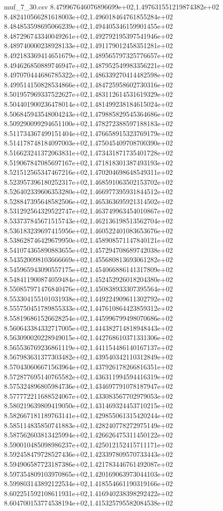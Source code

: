 \begin{filecontents*}{muf_7_30.csv}
8.479967646076896699e+02,1.497631551219874382e+02
8.482410566281618003e+02,1.496018464761855284e+02
8.484853598695066239e+02,1.494405346159901455e+02
8.487296743340049261e+02,1.492792195397541946e+02
8.489740000238928133e+02,1.491179012458351281e+02
8.492183369414651679e+02,1.489565797325776657e+02
8.494626850889746947e+02,1.487952549983356221e+02
8.497070444686785322e+02,1.486339270414482598e+02
8.499514150828534866e+02,1.484725958602730316e+02
8.501957969337522627e+02,1.483112614531619329e+02
8.504401900236478014e+02,1.481499238184615024e+02
8.506845943548004243e+02,1.479885829545364686e+02
8.509290099294651100e+02,1.478272388597188183e+02
8.511734367499151404e+02,1.476658915323769179e+02
8.514178748184097003e+02,1.475045409708700390e+02
8.516623241372063831e+02,1.473431871735401728e+02
8.519067847085697167e+02,1.471818301387493193e+02
8.521512565347467216e+02,1.470204698648549311e+02
8.523957396180252317e+02,1.468591063502153702e+02
8.526402339606353280e+02,1.466977395931844512e+02
8.528847395648582506e+02,1.465363695921314502e+02
8.531292564329522747e+02,1.463749963454010867e+02
8.533737845671515743e+02,1.462136198513562704e+02
8.536183239697415956e+02,1.460522401083653676e+02
8.538628746429679950e+02,1.458908571147840121e+02
8.541074365890883655e+02,1.457294708689742038e+02
8.543520098103666669e+02,1.455680813693061282e+02
8.545965943090557175e+02,1.454066886141317809e+02
8.548411900874059484e+02,1.452452926018204380e+02
8.550857971476840476e+02,1.450838933307395564e+02
8.553304155101031938e+02,1.449224909611302792e+02
8.555750451789855333e+02,1.447610864423859312e+02
8.558196861526628254e+02,1.445996799498070686e+02
8.560643384332717005e+02,1.444382714818948443e+02
8.563090020228949015e+02,1.442768610371331306e+02
8.565536769236861119e+02,1.441154486140167137e+02
8.567983631377303482e+02,1.439540342110312849e+02
8.570430606671563964e+02,1.437926178266816351e+02
8.572877695140765582e+02,1.436311994594416319e+02
8.575324896805984736e+02,1.434697791078187947e+02
8.577772211688524067e+02,1.433083567702979053e+02
8.580219639809419050e+02,1.431469324453710215e+02
8.582667181189763141e+02,1.429855061315420244e+02
8.585114835850741883e+02,1.428240778272975149e+02
8.587562603813425994e+02,1.426626475311450122e+02
8.590010485098986237e+02,1.425012152415711171e+02
8.592458479728527436e+02,1.423397809570733443e+02
8.594906587723187386e+02,1.421783446761492087e+02
8.597354809103970865e+02,1.420169063973044103e+02
8.599803143892122534e+02,1.418554661190319166e+02
8.602251592108611931e+02,1.416940238398292422e+02
8.604700153774538194e+02,1.415325795582084538e+02

\end{filecontents*}
